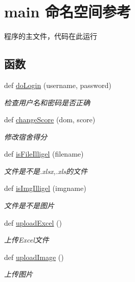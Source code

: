 \hypertarget{namespacemain}{}\section{main 命名空间参考}
\label{namespacemain}


程序的主文件，代码在此运行  


\subsection*{函数}
\begin{DoxyCompactItemize}
\item 
def \mbox{\hyperlink{namespacemain_ac89e4341171325314c0685e7f49d8015}{do\+Login}} (username, password)
\begin{DoxyCompactList}\small\item\em 检查用户名和密码是否正确 \end{DoxyCompactList}\item 
def \mbox{\hyperlink{namespacemain_a4f4216d6a8208604c32b24da5feeaf68}{change\+Score}} (dom, score)
\begin{DoxyCompactList}\small\item\em 修改宿舍得分 \end{DoxyCompactList}\item 
def \mbox{\hyperlink{namespacemain_ab4bfdca65955984f28c72a5d0daec565}{is\+File\+Illigel}} (filename)
\begin{DoxyCompactList}\small\item\em 文件是不是.\+xlsx,.xls的文件 \end{DoxyCompactList}\item 
def \mbox{\hyperlink{namespacemain_a0deb3fcf5caed9b545bb317bc0f2486f}{is\+Img\+Illigel}} (imgname)
\begin{DoxyCompactList}\small\item\em 文件是不是图片 \end{DoxyCompactList}\item 
def \mbox{\hyperlink{namespacemain_a7f709147939b2c6005d8efdddff85f7b}{upload\+Excel}} ()
\begin{DoxyCompactList}\small\item\em 上传\+Excel文件 \end{DoxyCompactList}\item 
def \mbox{\hyperlink{namespacemain_a3b88a9c9308bfa2308ae6cf744a63e4c}{upload\+Image}} ()
\begin{DoxyCompactList}\small\item\em 上传图片 \end{DoxyCompactList}\item 

\end{DoxyCompactItemize}

